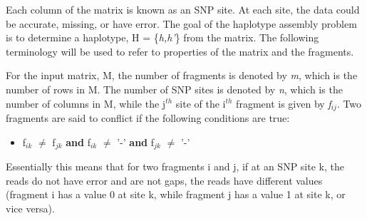 \documentclass[10pt,a4paer,twocolumn]{article}
\begin{document}
Each column of the matrix is known as an SNP site. At each site, the data could be accurate, missing, or have
error. The goal of the haplotype assembly problem is to determine a haplotype, H = \{\textit{h,h'}\}
from the matrix. The following terminology will be used to refer to properties of the matrix and the
fragments. 

For the input matrix, M, the number of fragments is denoted by \textit{m}, which is the number of rows in M.
The number of SNP sites is denoted by \textit{n}, which is the number of columns in M, while the j$^{th}$ 
site of the i$^{th}$ fragment is given by \textit{f$_{ij}$}. Two fragments are said to 
conflict if the following conditions are true:
\begin{itemize}
    \item{f$_{ik}$ $\neq$ f$_{jk}$ \textbf{and} f$_{ik}$ $\neq$ '-' \textbf{and} f$_{jk}$ $\neq$ '-' }
\end{itemize}
Essentially this means that for two fragments i and j, if at an SNP site k, the reads do not have error and are 
not gaps, the reads have different values (fragment i has a value 0 at site k, while fragment j has a value 
1 at site k, or vice versa). 
\end{document}
